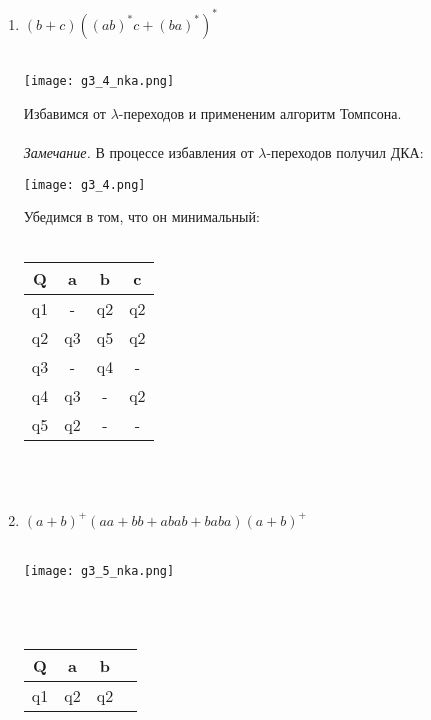 \documentclass{article}
\begin{document}
\begin{enumerate}
\begin{flushleft}
    \end{flushleft}
    \newpage
    \item {$(b + c)((ab)^*c + (ba)^*)^*$} \\ \\
    \begin{flushleft}
        \texttt{[image: g3\_4\_nka.png]}
    \end{flushleft}
    Избавимся от $\lambda$-переходов и примененим алгоритм Томпсона. \\ \\
    \textit{Замечание.} В процессе избавления от $\lambda$-переходов получил ДКА:
    \begin{flushleft}
        \texttt{[image: g3\_4.png]}
    \end{flushleft}
    Убедимся в том, что он минимальный: \\ \\
    \begin{tabular}{|c|c|c|c|}
        \hline
         Q              & a             & b         & c     \\ \hline
         q1             & -             & q2        & q2    \\
         q2             & q3            & q5        & q2    \\
         q3             & -             & q4        & -     \\ 
         q4             & q3            & -         & q2    \\
         q5             & q2            & -         & -     \\ 
         \hline
    \end{tabular} \\ \\
    \item {$(a + b)^+ (aa + bb + abab + baba)(a + b)^+$} \\ \\
    \begin{flushleft}
        \texttt{[image: g3\_5\_nka.png]}
    \end{flushleft}
     \\ \\
    \begin{tabular}{|c|c|c|c|}
         \hline
         Q              & a             & b             \\ \hline
         q1             & q2            & q2            \\

\end{tabular}
\end{enumerate}
\end{document}

